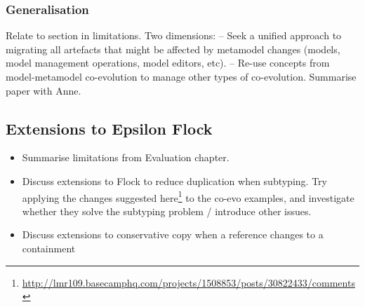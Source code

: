 \subsubsection{Generalisation}
Relate to section in limitations. Two dimensions:
-- Seek a unified approach to migrating all artefacts that might be affected by metamodel changes (models, model management operations, model editors, etc).
-- Re-use concepts from model-metamodel co-evolution to manage other types of co-evolution. Summarise paper with Anne.

\subsection{Extensions to Epsilon Flock}
\begin{itemize}
	\item Summarise limitations from Evaluation chapter.
	\item Discuss extensions to Flock to reduce duplication when subtyping.
	\subitem Try applying the changes suggested here\footnote{\url{http://lmr109.basecamphq.com/projects/1508853/posts/30822433/comments}} to the co-evo examples, and investigate whether they solve the subtyping problem / introduce other issues. 
	\item Discuss extensions to conservative copy when a reference changes to a containment
\end{itemize}